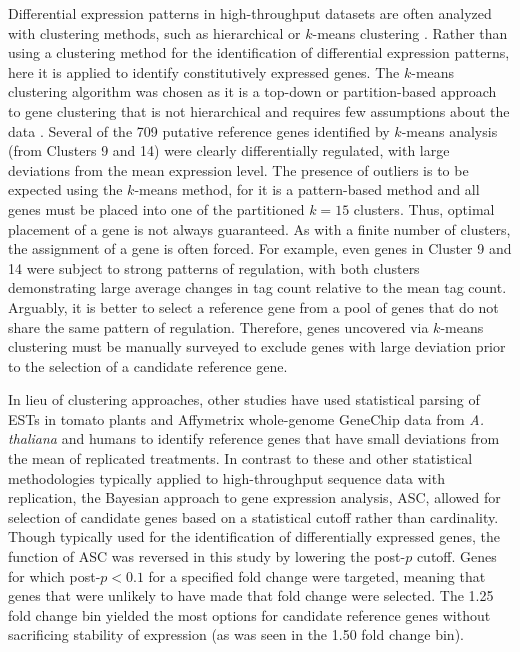 	Differential expression patterns in high-throughput datasets are often analyzed with clustering methods, such as hierarchical or $k$-means clustering \citep{Dhaeseleer2005}. Rather than using a clustering method for the identification of differential expression patterns, here it is applied to identify constitutively expressed genes. The $k$-means clustering algorithm was chosen as it is a top-down or partition-based approach to gene clustering that is not hierarchical and requires few assumptions about the data \citep{Hartigan1979}. Several of the 709 putative reference genes identified by $k$-means analysis (from Clusters 9 and 14) were clearly differentially regulated, with large deviations from the mean expression level. The presence of outliers is to be expected using the $k$-means method, for it is a pattern-based method and all genes must be placed into one of the partitioned $k = 15$ clusters. Thus, optimal placement of a gene is not always guaranteed. As with a finite number of clusters, the assignment of a gene is often forced. For example, even genes in Cluster 9 and 14 were subject to strong patterns of regulation, with both clusters demonstrating large average changes in tag count relative to the mean tag count. Arguably, it is better to select a reference gene from a pool of genes that do not share the same pattern of regulation. Therefore, genes uncovered via $k$-means clustering must be manually surveyed to exclude genes with large deviation prior to the selection of a candidate reference gene.\par
	In lieu of clustering approaches, other studies have used statistical parsing of ESTs in tomato plants \citep{Coker2003} and Affymetrix whole-genome GeneChip data from \textit{A. thaliana} \citep{Czechowski2005} and humans \citep{DeJonge2007a} to identify reference genes that have small deviations from the mean of replicated treatments. In contrast to these and other statistical methodologies typically applied to high-throughput sequence data with replication, the Bayesian approach to gene expression analysis, ASC, allowed for selection of candidate genes based on a statistical cutoff rather than cardinality. Though typically used for the identification of differentially expressed genes, the function of ASC was reversed in this study by lowering the post-$p$ cutoff. Genes for which post-$p < 0.1$ for a specified fold change were targeted, meaning that genes that were unlikely to have made that fold change were selected. The 1.25 fold change bin yielded the most options for candidate reference genes without sacrificing stability of expression (as was seen in the 1.50 fold change bin). \par
